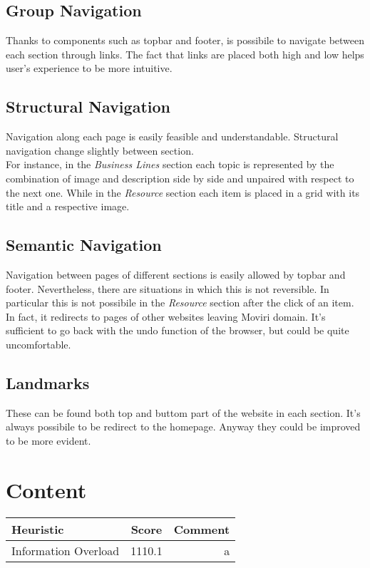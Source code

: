 \subsection{Group Navigation}
Thanks to components such as topbar and footer, is possibile to navigate between each section through links. The fact that links are placed both high and low helps user's experience to be more intuitive.
\subsection{Structural Navigation}
Navigation along each page is easily feasible and understandable. Structural navigation change slightly between section.\\
For instance, in the \textit{Business Lines} section each topic is represented by the combination of image and description side by side and unpaired with respect to the next one.
While in the \textit{Resource} section each item is placed in a grid with its title and a respective image.  

\subsection{Semantic Navigation}
Navigation between pages of different sections is easily allowed by topbar and footer. Nevertheless, there are situations in which this is not reversible. In particular this is not possibile in the \textit{Resource} section after the click of an item. In fact, it redirects to pages of other websites leaving Moviri domain. It's sufficient to go back with the undo function of the browser, but could be quite uncomfortable.
\subsection{Landmarks}
These can be found both top and buttom part of the website in each section. It's always possibile to be redirect to the homepage. Anyway they could be improved to be more evident.

\section{Content}
\begin{table}[H]
  \begin{center}
    \label{tab:table1}
    \begin{tabular}{l|c|r} %
      \textbf{Heuristic} & \textbf{Score} & \textbf{Comment}\\
      
      \hline
     Information Overload & 1110.1 & a\\
     
    \end{tabular}
  \end{center}
\end{table}
